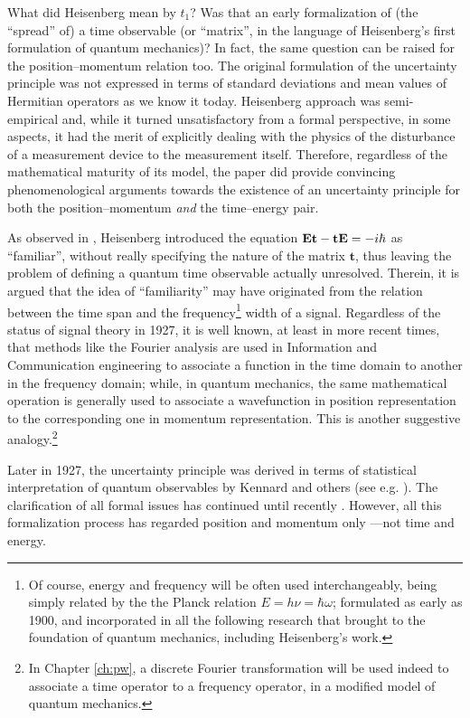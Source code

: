 What did Heisenberg mean by $t_1$? Was that an early formalization of (the ``spread'' of)
a time observable (or ``matrix'', in the language of Heisenberg's first formulation of quantum mechanics)?
In fact, the same question can be raised for the position--momentum
relation too. The original formulation of the uncertainty principle
was not expressed in terms of standard deviations and mean values of Hermitian operators
as we know it today. Heisenberg approach was semi-empirical and,
while it turned unsatisfactory from a formal perspective, in some aspects,
it had the merit of explicitly dealing with the physics of the disturbance
of a measurement device to the measurement itself. Therefore,
regardless of the mathematical maturity of its model,
the paper did provide convincing phenomenological arguments towards
the existence of an uncertainty principle for both the position--momentum
\emph{and} the time--energy pair.

As observed in \cite[.3]{TQM1}, Heisenberg introduced the equation
$\mathbf{Et}-\mathbf{tE} = -i\hbar$
as ``familiar'', without really specifying the nature of the matrix $\mathbf{t}$,
thus leaving the problem of defining a quantum time observable actually unresolved.
Therein, it is argued that the idea of ``familiarity'' may have originated from the
relation between
the time span and the frequency\footnote{
  Of course, energy and frequency will be often used interchangeably,
  being
  simply related by the the Planck relation $E = h\nu = \hbar\omega$;
  formulated as early as 1900, and incorporated in all the following research
  that brought to the foundation of quantum mechanics, including Heisenberg's work.
}
width of a signal. Regardless of the status
of signal theory in 1927, it is well known, at least in more recent times, that
methods like the Fourier analysis are used in Information and Communication engineering to associate a function in the time domain
to another in the frequency domain; while, in quantum mechanics, the same mathematical operation
is generally used to associate a wavefunction in position representation to
the corresponding one in momentum representation.
This is another suggestive analogy.\footnote{
  In Chapter \ref{ch:pw}, a discrete Fourier transformation will be used indeed to
  associate a time operator to a frequency operator,
  in a modified model of quantum mechanics.
}

Later in 1927, the uncertainty principle was derived in terms of
statistical interpretation of quantum observables
by Kennard and others (see e.g. \cite{Kennard1927}).
The clarification of all formal issues has continued until recently \parencite{Appleby}.
However, all this formalization process has regarded position and momentum only
---not time and energy.


